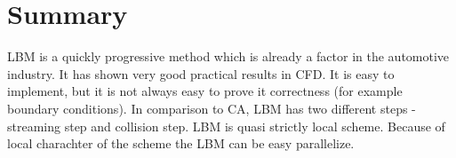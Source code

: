 
\section{Summary}

LBM is a quickly progressive method which is already a factor in the automotive industry. It has shown very good practical results in CFD. It is easy to implement, but it is not always easy to prove it correctness (for example boundary conditions). 
In comparison to CA, LBM has two different steps - streaming step and collision step. LBM is quasi strictly local scheme. Because of local charachter of the scheme the LBM can be easy parallelize.
